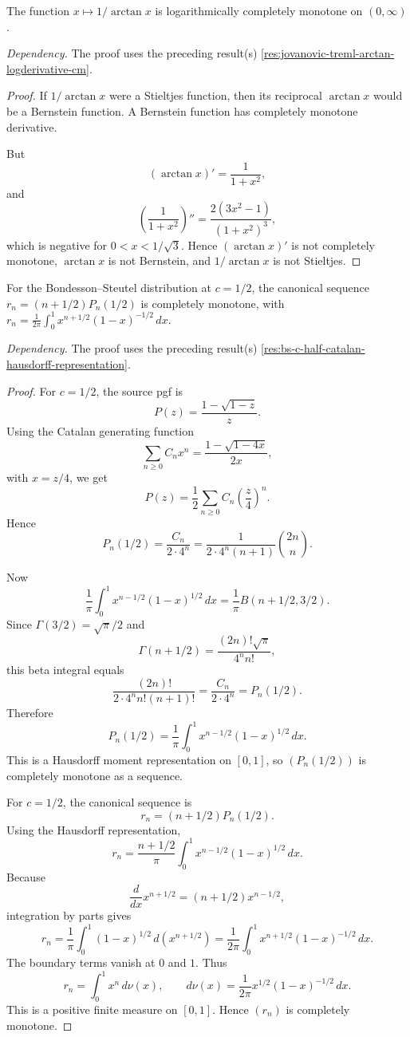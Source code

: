 \begin{proposition}
\label{res:reciprocal-arctan-lcm}
The function \(x\mapsto1/\arctan x\) is logarithmically completely monotone on \((0,\infty)\).

\emph{Dependency.} The proof uses the preceding result(s) \ref{res:jovanovic-treml-arctan-logderivative-cm}.
\end{proposition}
\begin{proof}
If \(1/\arctan x\) were a Stieltjes function, then its reciprocal \(\arctan x\) would be a Bernstein function. A Bernstein function has completely monotone derivative.

But
\[
(\arctan x)'=\frac1{1+x^2},
\]
and
\[
\left(\frac1{1+x^2}\right)''
=\frac{2(3x^2-1)}{(1+x^2)^3},
\]
which is negative for \(0<x<1/\sqrt3\). Hence \((\arctan x)'\) is not completely monotone, \(\arctan x\) is not Bernstein, and \(1/\arctan x\) is not Stieltjes.
\end{proof}

\begin{proposition}
\label{res:bs-c-half-canonical-r-sequence-cm}
For the Bondesson--Steutel distribution at \(c=1/2\), the canonical sequence \(r_n=(n+1/2)P_n(1/2)\) is completely monotone, with \(r_n=\frac{1}{2\pi}\int_0^1 x^{n+1/2}(1-x)^{-1/2}\,dx\).

\emph{Dependency.} The proof uses the preceding result(s) \ref{res:bs-c-half-catalan-hausdorff-representation}.
\end{proposition}
\begin{proof}
For \(c=1/2\), the source pgf is
\[
P(z)=\frac{1-\sqrt{1-z}}{z}.
\]
Using the Catalan generating function
\[
\sum_{n\ge0}C_n x^n=\frac{1-\sqrt{1-4x}}{2x},
\]
with \(x=z/4\), we get
\[
P(z)=\frac12\sum_{n\ge0}C_n\left(\frac z4\right)^n.
\]
Hence
\[
P_n(1/2)=\frac{C_n}{2\cdot4^n}
=\frac{1}{2\cdot4^n(n+1)}\binom{2n}{n}.
\]

Now
\[
\frac1\pi\int_0^1 x^{n-1/2}(1-x)^{1/2}\,dx
=\frac1\pi B(n+1/2,3/2).
\]
Since \(\Gamma(3/2)=\sqrt\pi/2\) and
\[
\Gamma(n+1/2)=\frac{(2n)!\sqrt\pi}{4^n n!},
\]
this beta integral equals
\[
\frac{(2n)!}{2\cdot4^n n!(n+1)!}
=\frac{C_n}{2\cdot4^n}
=P_n(1/2).
\]
Therefore
\[
P_n(1/2)=\frac1\pi\int_0^1 x^{n-1/2}(1-x)^{1/2}\,dx.
\]
This is a Hausdorff moment representation on \([0,1]\), so \((P_n(1/2))\) is completely monotone as a sequence.

For \(c=1/2\), the canonical sequence is
\[
r_n=(n+1/2)P_n(1/2).
\]
Using the Hausdorff representation,
\[
r_n=\frac{n+1/2}{\pi}\int_0^1 x^{n-1/2}(1-x)^{1/2}\,dx.
\]
Because
\[
\frac{d}{dx}x^{n+1/2}=(n+1/2)x^{n-1/2},
\]
integration by parts gives
\[
r_n
=\frac1\pi\int_0^1 (1-x)^{1/2}\,d(x^{n+1/2})
=\frac{1}{2\pi}\int_0^1 x^{n+1/2}(1-x)^{-1/2}\,dx.
\]
The boundary terms vanish at \(0\) and \(1\). Thus
\[
r_n=\int_0^1 x^n\,d\nu(x),
\qquad
d\nu(x)=\frac{1}{2\pi}x^{1/2}(1-x)^{-1/2}\,dx.
\]
This is a positive finite measure on \([0,1]\). Hence \((r_n)\) is completely monotone.
\end{proof}

